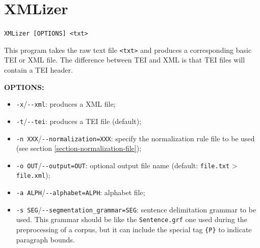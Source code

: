 \section{XMLizer}
\label{section-XMLizer}
\verb+XMLizer [OPTIONS] <txt>+

\bigskip
\noindent This program takes the raw text file \verb+<txt>+ and produces a
corresponding basic TEI or XML file. The difference between TEI and XML is that 
TEI files will contain a TEI header.

\bigskip
\noindent \textbf{OPTIONS:}
\begin{itemize}
  \item \verb+-x+/\verb+--xml+: produces a XML file;
  
  \item \verb+-t+/\verb+--tei+: produces a TEI file (default);

  \item \verb+-n XXX+/\verb+--normalization=XXX+: specify the normalization
  rule file to be used (see section \ref{section-normalization-file});

  \item \verb+-o OUT+/\verb+--output=OUT+: optional output file name (default:
  \verb+file.txt+ > \verb+file.xml+);

  \item \verb+-a ALPH+/\verb+--alphabet=ALPH+: alphabet file;
  
  \item \verb+-s SEG+/\verb+--segmentation_grammar=SEG+: sentence delimitation 
  grammar to be used. This grammar should be like the \verb+Sentence.grf+ one used 
  during the preprocessing of a corpus, but it can include the special tag \verb+{P}+ 
  to indicate paragraph bounds.
\end{itemize}

